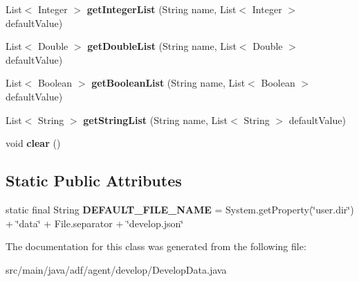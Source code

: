 \begin{DoxyCompactItemize}
List$<$ Integer $>$ {\bfseries get\+Integer\+List} (String name, List$<$ Integer $>$ default\+Value)
\item 
\hypertarget{classadf_1_1agent_1_1develop_1_1DevelopData_a20772951f2c49bbae32b285c23662221}{}\label{classadf_1_1agent_1_1develop_1_1DevelopData_a20772951f2c49bbae32b285c23662221} 
List$<$ Double $>$ {\bfseries get\+Double\+List} (String name, List$<$ Double $>$ default\+Value)
\item 
\hypertarget{classadf_1_1agent_1_1develop_1_1DevelopData_a94e976b28a65fbf8055e6283a31236cc}{}\label{classadf_1_1agent_1_1develop_1_1DevelopData_a94e976b28a65fbf8055e6283a31236cc} 
List$<$ Boolean $>$ {\bfseries get\+Boolean\+List} (String name, List$<$ Boolean $>$ default\+Value)
\item 
\hypertarget{classadf_1_1agent_1_1develop_1_1DevelopData_a5dd5fb6da9a779b77029a0135ce196aa}{}\label{classadf_1_1agent_1_1develop_1_1DevelopData_a5dd5fb6da9a779b77029a0135ce196aa} 
List$<$ String $>$ {\bfseries get\+String\+List} (String name, List$<$ String $>$ default\+Value)
\item 
\hypertarget{classadf_1_1agent_1_1develop_1_1DevelopData_a85d6ec19049355a23283aac6b93b4584}{}\label{classadf_1_1agent_1_1develop_1_1DevelopData_a85d6ec19049355a23283aac6b93b4584} 
void {\bfseries clear} ()
\end{DoxyCompactItemize}
\subsection*{Static Public Attributes}
\begin{DoxyCompactItemize}
\item 
\hypertarget{classadf_1_1agent_1_1develop_1_1DevelopData_a854803523cdad900342fa22a3ba8efbb}{}\label{classadf_1_1agent_1_1develop_1_1DevelopData_a854803523cdad900342fa22a3ba8efbb} 
static final String {\bfseries D\+E\+F\+A\+U\+L\+T\+\_\+\+F\+I\+L\+E\+\_\+\+N\+A\+ME} = System.\+get\+Property(\char`\"{}user.\+dir\char`\"{}) + \char`\"{}data\char`\"{} + File.\+separator + \char`\"{}develop.\+json\char`\"{}
\end{DoxyCompactItemize}


The documentation for this class was generated from the following file\+:\begin{DoxyCompactItemize}
\item 
src/main/java/adf/agent/develop/Develop\+Data.\+java\end{DoxyCompactItemize}
